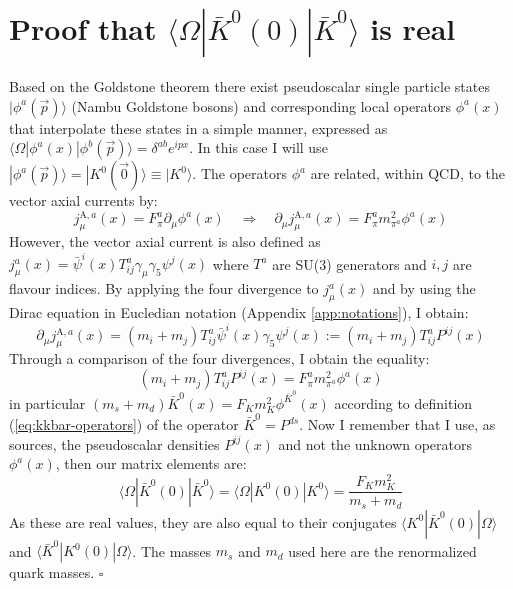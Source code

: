 \documentclass[english, LaM, oneside, noexaminfo]{sapthesis}
\newcommand{\la}{\langle}
\newcommand{\ra}{\rangle}
\newcommand{\proved}{\newline \hspace*{.97\textwidth} $\square$}
\begin{document}
\section{Proof that $\la \Omega | \bar K^0 (0) | \bar K^0 \ra$ is real}\label{app:proof-reality}
\noindent
Based on the Goldstone theorem \cite{Goldstone-Theorem} there exist pseudoscalar single particle states $| \phi^a (\vec p) \ra$ (Nambu Goldstone bosons) and corresponding local operators $\phi^a(x)$ that interpolate these states in a simple manner, expressed as $\la\Omega | \phi^a (x) | \phi^b (\vec p) \ra = \delta^{ab}e^{ipx} $.
In this case I will use $|\phi^a(\vec p)\ra = | K^0 (\vec 0)\ra \equiv | K^0 \ra$.
The operators $\phi^a$ are related, within QCD, to the vector axial currents by:
\begin{equation*}
    j_\mu^{\text{A},a} (x) = F_\pi^a \partial_\mu \phi^a (x)
    \quad \Rightarrow \quad
    \partial_\mu j_\mu^{\text{A},a} (x) = F_\pi^a m_{\pi^a}^2 \phi^a (x)
\end{equation*}
However, the vector axial current is also defined as $j_\mu^a(x) = \bar \psi^i (x) T^a_{ij}\gamma_\mu \gamma_5 \psi^j (x)$ where $T^a$ are SU(3) generators and $i,j$ are flavour indices.
By applying the four divergence to $j_\mu^a(x)$ and by using the Dirac equation in Eucledian notation (Appendix \ref{app:notations}), I obtain:
\begin{equation*}
    \partial_\mu j_\mu^{\text{A},a} (x) = (m_i + m_j) T^a_{ij}\bar\psi^i (x) \gamma_5 \psi^j (x) := (m_i + m_j) T^a_{ij} P^{ij}(x)
\end{equation*}
Through a comparison of the four divergences, I obtain the equality:
\begin{equation*}
    (m_i + m_j) T^a_{ij} P^{ij}(x) = F_\pi^a m_{\pi^a}^2 \phi^a (x)
\end{equation*}
in particular $(m_s + m_d) \bar K^0(x) = F_K m_{K}^2 \phi^{\bar K^0} (x)$ according to definition (\ref{eq:kkbar-operators}) of the operator $\bar K^0 = P^{ds}$.
Now I remember that I use, as sources, the pseudoscalar densities $P^{ij}(x)$ and not the unknown operators $\phi^a (x)$, then our matrix elements are:
\begin{equation*}
    \la \Omega | \bar K^0 (0) |  \bar K^0 \ra = \la \Omega | K^0 (0) | K^0 \ra = \frac{F_K m_K^2}{m_s + m_d}
\end{equation*}
As these are real values, they are also equal to their conjugates  $\la K^0  | \bar K^0 (0) |  \Omega\ra$ and $\la\bar K^0 | K^0 (0) | \Omega\ra$.
The masses $m_s$ and $m_d$ used here are the renormalized quark masses.
\proved
\end{document}
